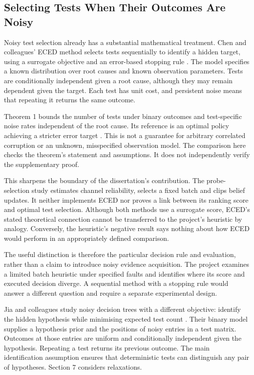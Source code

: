 \subsection{Selecting Tests When Their Outcomes Are Noisy}

Noisy test selection already has a substantial mathematical treatment. Chen and colleagues' ECED method selects tests
sequentially to identify a hidden target, using a surrogate objective and an error-based stopping rule
\parencite[Sections 2--3]{chen2017noisy}. The model specifies a known distribution over root causes and known observation
parameters. Tests are conditionally independent given a root cause, although they may remain dependent given the target.
Each test has unit cost, and persistent noise means that repeating it returns the same outcome.

Theorem 1 bounds the number of tests under binary outcomes and test-specific noise rates independent of the root cause.
Its reference is an optimal policy achieving a stricter error target \parencite[Section 3, Theorem 1]{chen2017noisy}.
This is not a guarantee for arbitrary correlated corruption or an unknown, misspecified observation model. The comparison
here checks the theorem's statement and assumptions. It does not independently verify the supplementary proof.

This sharpens the boundary of the dissertation's contribution. The probe-selection study estimates channel reliability, selects a fixed batch and
clips belief updates. It neither implements ECED nor proves a link between its ranking score and optimal test selection.
Although both methods use a surrogate score, ECED's stated theoretical connection cannot be transferred to the project's heuristic by analogy.
Conversely, the heuristic's negative result says nothing about how ECED would perform in an appropriately defined comparison.

The useful distinction is therefore the particular decision rule and evaluation, rather than a claim to introduce noisy
evidence acquisition. The project examines a limited batch heuristic under specified faults and identifies where its score
and executed decision diverge. A sequential method with a stopping rule would answer a different question and require a
separate experimental design.

Jia and colleagues study noisy decision trees with a different objective: identify the hidden hypothesis while minimising
expected test count \parencite[Sections 1--2]{jia2024noisy}. Their binary model supplies a hypothesis prior and the positions
of noisy entries in a test matrix. Outcomes at those entries are uniform and conditionally independent given the hypothesis.
Repeating a test returns its previous outcome. The main identification assumption ensures that deterministic tests can
distinguish any pair of hypotheses. Section 7 considers relaxations.

